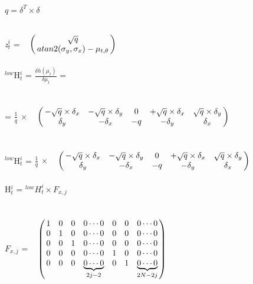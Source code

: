 \documentclass{ba-kecs}
\numberwithin{figure}{section}
\numberwithin{equation}{section}
\begin{document}
$\textit{q} = \delta^{T} \times \delta$

\textit{z}$^{i}_{t}$ = $\bordermatrix{~ \cr
                  			& \sqrt{q}  \cr
                  			& atan2(\sigma_{y},\sigma_{x}) - \mu_{t,\theta}}$\\ \\
                  			
$^{low}$H$^{i}_{t}$ = $\frac{\delta h(\mu_{t})}{\delta{\mu_{t}}}$ = \\ \\ = $\frac{1}{q}$ $\times$ $\bordermatrix{~ \cr
                  				& -\sqrt{q} \times \delta_{x} & -\sqrt{q} \times \delta_{y} & 0 & +\sqrt{q} \times \delta_{x} & \sqrt{q} \times \delta_{y}  \cr
                  				& \delta_{y} & -\delta_{x} & -q & -\delta_{y} & \delta_{x}} $\\ \\
                  				
$^{low}$H$^{i}_{t}$ = $\frac{1}{q}$ $\times$ $\bordermatrix{~ \cr
                  				& -\sqrt{q} \times \delta_{x} & -\sqrt{q} \times \delta_{y} & 0 & +\sqrt{q} \times \delta_{x} & \sqrt{q} \times \delta_{y}  \cr
                  				& \delta_{y} & -\delta_{x} & -q & -\delta_{y} & \delta_{x}} $\\ \\
                  				
H$^{i}_{t}$ = $^{low}H^{i}_{t} \times F_{x,j}$
\\ \\
$F_{x,j}$ = $\bordermatrix{~ \cr
                  			& 1 & 0 & 0 & 0 \cdots 0 & 0 & 0 & 0 \cdots 0 \cr
                  			& 0 & 1 & 0 & 0 \cdots 0 & 0 & 0 & 0 \cdots 0 \cr
                  			& 0 & 0 & 1 & 0 \cdots 0 & 0 & 0 & 0 \cdots 0 \cr
                  			& 0 & 0 & 0 & 0 \cdots 0 & 1 & 0 & 0 \cdots 0 \cr
                  			& 0 & 0 & 0 & \underbrace{0 \cdots 0}_{2j-2} & 0 & 1 & \underbrace{0 \cdots 0}_{2N-2j} \cr}$

\end{document}
